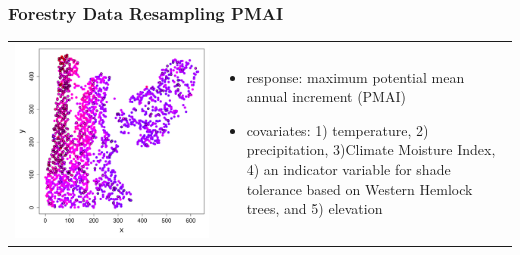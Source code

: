\documentclass[mathserif,compress]{beamer}\usepackage{graphicx, color}
\makeatletter
\def\maxwidth{ %
  \ifdim\Gin@nat@width>\linewidth
    \linewidth
  \else
    \Gin@nat@width
  \fi
}
\makeatother
\begin{document}

\begin{frame}[fragile]
\frametitle{Forestry Data Resampling PMAI}

	\begin{tabular}	{p{5cm} p{4cm}}
		\vspace{-.1cm}
		\includegraphics[width=\maxwidth]{figure/pmaiUnbalSamp} &
		\vspace{-.1cm}
		\footnotesize
		\begin{itemize}
			\item response: maximum potential mean annual increment (PMAI)
			\item covariates: 1) temperature, 2) precipitation, 3)Climate Moisture Index, 4) an indicator variable for shade tolerance based on Western Hemlock trees, and 5) elevation
		\end{itemize}
	\end{tabular}

\end{frame}

\end{document}
